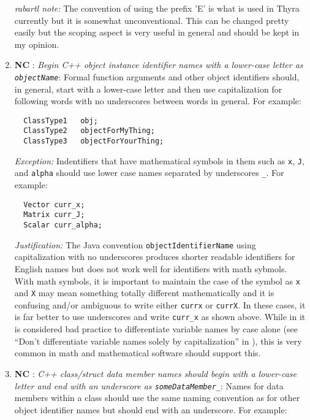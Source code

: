 \begin{enumerate}
{}\textit{rabartl note:} The convention of using the prefix 'E' is what is
used in Thyra currently but it is somewhat unconventional.  This can be
changed pretty easily but the scoping aspect is very useful in general and
should be kept in my opinion.

{}\item{}\textbf{NC }:
{}\textit{Begin C++ object instance identifier names with a lower-case letter
as {}\texttt{objectName}}: Formal function arguments and other object
identifiers should, in general, start with a lower-case letter and then use
capitalization for following words with no underscores between words in
general.  For example:

{\small\begin{verbatim}
  ClassType1   obj;
  ClassType2   objectForMyThing;
  ClassType3   objectForYourThing;
\end{verbatim}}

{}\textit{Exception:} Indentifiers that have mathematical symbols in them such
as {}\texttt{x}, {}\texttt{J}, and {}\texttt{alpha} should use lower case
names separated by underscores {}\texttt{\_}.  For example:

{\small\begin{verbatim}
  Vector curr_x;
  Matrix curr_J;
  Scalar curr_alpha;
\end{verbatim}}

{}\textit{Justification:} The Java convention {}\texttt{objectIdentifierName}
using capitalization with no underscores produces shorter readable identifiers
for English names but does not work well for identifiers with math sybmols.
With math symbols, it is important to maintain the case of the symbol as
{}\texttt{x} and {}\texttt{X} may mean something totally different
mathematically and it is confusing and/or ambiguous to write either
{}\texttt{currx} or {}\texttt{currX}.  In these cases, it is far better to use
underscores and write {}\texttt{curr\_x} as shown above.  While in it is
considered bad practice to differentiate variable names by case alone (see
``Don't differentiate variable names solely by capitalization'' in
{}\cite[Section 11.7]{CodeComplete2nd04}), this is very common in math and
mathematical software should support this.

{}\item{}\textbf{NC }:
{}\textit{C++ class/struct data member names should begin with a lower-case
letter and end with an underscore as {}\texttt{someDataMember\_}}: Names for
data members within a class should use the same naming convention as for other
object identifier names but should end with an underscore.  For example:


\end{enumerate}
